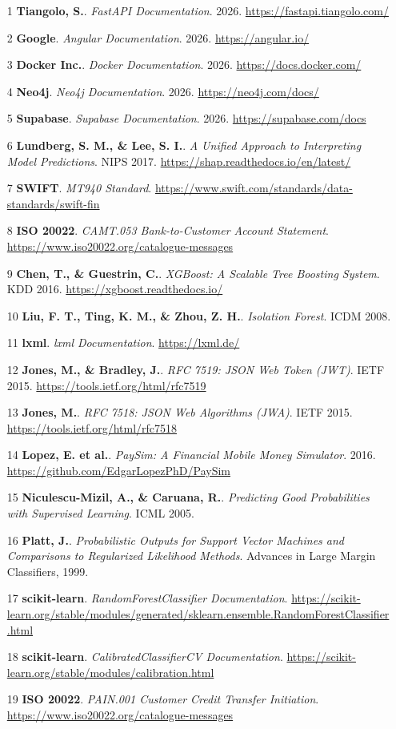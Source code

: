 \documentclass[12pt,a4paper]{extreport}
\begin{document}
\begin{itemize}
    \item[1] \textbf{Tiangolo, S.}. \emph{FastAPI Documentation}. 2026. \url{https://fastapi.tiangolo.com/}
    \item[2] \textbf{Google}. \emph{Angular Documentation}. 2026. \url{https://angular.io/}
    \item[3] \textbf{Docker Inc.}. \emph{Docker Documentation}. 2026. \url{https://docs.docker.com/}
    \item[4] \textbf{Neo4j}. \emph{Neo4j Documentation}. 2026. \url{https://neo4j.com/docs/}
    \item[5] \textbf{Supabase}. \emph{Supabase Documentation}. 2026. \url{https://supabase.com/docs}
    \item[6] \textbf{Lundberg, S. M., \& Lee, S. I.}. \emph{A Unified Approach to Interpreting Model Predictions}. NIPS 2017. \url{https://shap.readthedocs.io/en/latest/}
    \item[7] \textbf{SWIFT}. \emph{MT940 Standard}. \url{https://www.swift.com/standards/data-standards/swift-fin}
    \item[8] \textbf{ISO 20022}. \emph{CAMT.053 Bank-to-Customer Account Statement}. \url{https://www.iso20022.org/catalogue-messages}
    \item[9] \textbf{Chen, T., \& Guestrin, C.}. \emph{XGBoost: A Scalable Tree Boosting System}. KDD 2016. \url{https://xgboost.readthedocs.io/}
    \item[10] \textbf{Liu, F. T., Ting, K. M., \& Zhou, Z. H.}. \emph{Isolation Forest}. ICDM 2008.
    \item[11] \textbf{lxml}. \emph{lxml Documentation}. \url{https://lxml.de/}
    \item[12] \textbf{Jones, M., \& Bradley, J.}. \emph{RFC 7519: JSON Web Token (JWT)}. IETF 2015. \url{https://tools.ietf.org/html/rfc7519}
    \item[13] \textbf{Jones, M.}. \emph{RFC 7518: JSON Web Algorithms (JWA)}. IETF 2015. \url{https://tools.ietf.org/html/rfc7518}
    \item[14] \textbf{Lopez, E. et al.}. \emph{PaySim: A Financial Mobile Money Simulator}. 2016. \url{https://github.com/EdgarLopezPhD/PaySim}
    \item[15] \textbf{Niculescu-Mizil, A., \& Caruana, R.}. \emph{Predicting Good Probabilities with Supervised Learning}. ICML 2005.
    \item[16] \textbf{Platt, J.}. \emph{Probabilistic Outputs for Support Vector Machines and Comparisons to Regularized Likelihood Methods}. Advances in Large Margin Classifiers, 1999.
    \item[17] \textbf{scikit-learn}. \emph{RandomForestClassifier Documentation}. \url{https://scikit-learn.org/stable/modules/generated/sklearn.ensemble.RandomForestClassifier.html}
    \item[18] \textbf{scikit-learn}. \emph{CalibratedClassifierCV Documentation}. \url{https://scikit-learn.org/stable/modules/calibration.html}
    \item[19] \textbf{ISO 20022}. \emph{PAIN.001 Customer Credit Transfer Initiation}. \url{https://www.iso20022.org/catalogue-messages}
\end{itemize}
\end{document}
